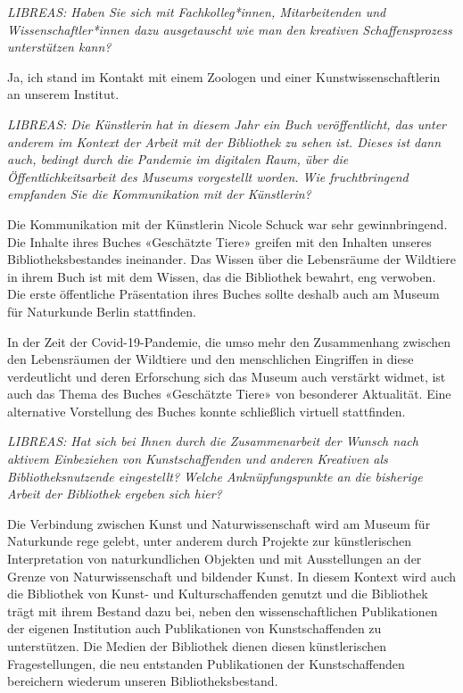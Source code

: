 \documentclass[a4paper,
fontsize=11pt,
oneside,
numbers=noperiodatend,
parskip=half-,
bibliography=totoc,
final
]{scrartcl}
\begin{document}
\emph{LIBREAS: Haben Sie sich mit Fachkolleg*innen, Mitarbeitenden und
Wissenschaftler*innen dazu ausgetauscht wie man den kreativen
Schaffensprozess unterstützen kann?}

Ja, ich stand im Kontakt mit einem Zoologen und einer
Kunstwissenschaftlerin an unserem Institut.

\emph{LIBREAS: Die Künstlerin hat in diesem Jahr ein Buch
veröffentlicht, das unter anderem im Kontext der Arbeit mit der
Bibliothek zu sehen ist. Dieses ist dann auch, bedingt durch die
Pandemie im digitalen Raum, über die Öffentlichkeitsarbeit des Museums
vorgestellt worden. Wie fruchtbringend empfanden Sie die Kommunikation
mit der Künstlerin?}

Die Kommunikation mit der Künstlerin Nicole Schuck war sehr
gewinnbringend. Die Inhalte ihres Buches «Geschätzte Tiere» greifen mit
den Inhalten unseres Bibliotheksbestandes ineinander. Das Wissen über
die Lebensräume der Wildtiere in ihrem Buch ist mit dem Wissen, das die
Bibliothek bewahrt, eng verwoben. Die erste öffentliche Präsentation
ihres Buches sollte deshalb auch am Museum für Naturkunde Berlin
stattfinden.

In der Zeit der Covid-19-Pandemie, die umso mehr den Zusammenhang
zwischen den Lebensräumen der Wildtiere und den menschlichen Eingriffen
in diese verdeutlicht und deren Erforschung sich das Museum auch
verstärkt widmet, ist auch das Thema des Buches «Geschätzte Tiere» von
besonderer Aktualität. Eine alternative Vorstellung des Buches konnte
schließlich virtuell stattfinden.

\emph{LIBREAS: Hat sich bei Ihnen durch die Zusammenarbeit der Wunsch
nach aktivem Einbeziehen von Kunstschaffenden und anderen Kreativen als
Bibliotheksnutzende eingestellt? Welche Anknüpfungspunkte an die
bisherige Arbeit der Bibliothek ergeben sich hier?}

Die Verbindung zwischen Kunst und Naturwissenschaft wird am Museum für
Naturkunde rege gelebt, unter anderem durch Projekte zur künstlerischen
Interpretation von naturkundlichen Objekten und mit Ausstellungen an der
Grenze von Naturwissenschaft und bildender Kunst. In diesem Kontext wird
auch die Bibliothek von Kunst- und Kulturschaffenden genutzt und die
Bibliothek trägt mit ihrem Bestand dazu bei, neben den
wissenschaftlichen Publikationen der eigenen Institution auch
Publikationen von Kunstschaffenden zu unterstützen. Die Medien der
Bibliothek dienen diesen künstlerischen Fragestellungen, die neu
entstanden Publikationen der Kunstschaffenden bereichern wiederum
unseren Bibliotheksbestand.
\end{document}
